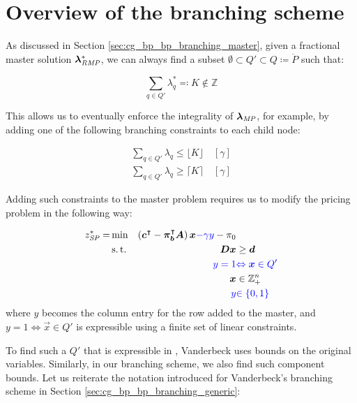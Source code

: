 \section{Overview of the branching scheme}\label{sec:cmpbnd_overview}
As discussed in Section \ref{sec:cg_bp_bp_branching_master}, given a fractional master solution ${\bm{\lambda}}^*_{\textit{RMP}}{}$, we can always find a subset $\emptyset \subset Q' \subset Q \coloneqq \ddot{P}$ such that:

\begin{equation}\label{eq:compbnd_branching_master}
\sum_{q \in Q'} \lambda_q^* \eqqcolon K \not\in \mathbb{Z}
\end{equation}

This allows us to eventually enforce the integrality of ${\bm{\lambda}}_{\textit{MP}}{}$, for example, by adding one of the following branching constraints to each child node:

\begin{equation}
\begin{aligned}
\sum_{q \in Q'} \lambda_q \leq \lfloor K \rfloor \quad \left[\gamma\right] \\
\sum_{q \in Q'} \lambda_q \geq \lceil K \rceil \quad \left[\gamma\right]
\end{aligned}
\end{equation}

Adding such constraints to the master problem requires us to modify the pricing problem in the following way:

\begin{equation}
\begin{aligned}
z^*_\SP{} = &\min & \left( \vec{c}\transpose - \vec{\pi}_\vec{b}\transpose \mat{A} \right) \vec{x} {\color{blue} - \gamma y} - \pi_0 & \\
&\st & \mat{D} \vec{x} & \geq \vec{d} \\
&& {\color{blue} y = 1} & {\color{blue} \Leftrightarrow \vec{x} \in Q'} \\
&& \vec{x} & \in \mathbb{Z}_+^n \\
&& {\color{blue} y} & {\color{blue} \in \{0, 1\}}
\end{aligned}
\end{equation}
where $y$ becomes the column entry for the row added to the master, and $y = 1 \Leftrightarrow \vec{x} \in Q'$ is expressible using a finite set of linear constraints.

To find such a $Q'$ that is expressible in \SP{}, Vanderbeck uses bounds on the original variables. Similarly, in our branching scheme, we also find such component bounds. Let us reiterate the notation introduced for Vanderbeck's branching scheme in Section \ref{sec:cg_bp_bp_branching_generic}:


